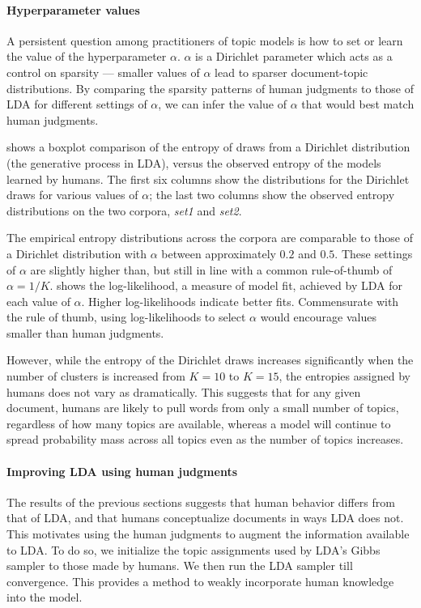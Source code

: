 \paragraph{Hyperparameter values} A persistent question among
practitioners of topic models is how to set or learn the value of the
hyperparameter $\alpha$.  $\alpha$ is a Dirichlet parameter which acts
as a control on sparsity --- smaller values of $\alpha$ lead to sparser
document-topic distributions.  By comparing the sparsity patterns of
human judgments to those of LDA for different settings of $\alpha$, we
can infer the value of $\alpha$ that would best match human judgments.

 shows a boxplot comparison of the entropy of draws
from a Dirichlet distribution (the generative process in LDA), versus
the observed entropy of the models learned by humans.  The first six
columns show the distributions for the Dirichlet draws for various
values of $\alpha$; the last two columns show the observed entropy
distributions on the two corpora, \emph{set1} and \emph{set2}.

The empirical entropy distributions across the corpora are comparable
to those of a Dirichlet distribution with $\alpha$ between
approximately $0.2$ and $0.5$.  These settings of $\alpha$ are
slightly higher than, but still in line with a common rule-of-thumb of
$\alpha = 1 / K$.   shows the log-likelihood, a measure
of model fit, achieved by LDA for each value of $\alpha$.  Higher
log-likelihoods indicate better fits.  Commensurate with the rule of
thumb, using log-likelihoods to select $\alpha$ would encourage values
smaller than human judgments.

However, while the entropy of the Dirichlet draws increases
significantly when the number of clusters is increased from $K=10$ to
$K=15$, the entropies assigned by humans does not vary as
dramatically.  This suggests that for any given document, humans are
likely to pull words from only a small number of topics, regardless of
how many topics are available, whereas a model will continue to spread
probability mass across all topics even as the number of topics
increases.

\paragraph{Improving LDA using human judgments} The results of the
previous sections suggests that human behavior differs from that of
LDA, and that humans conceptualize documents in ways LDA does
not. This motivates using the human judgments to augment the
information available to LDA.  To do so, we initialize the topic
assignments used by LDA's Gibbs sampler to those made by humans.  We
then run the LDA sampler till convergence.  This provides a method to
weakly incorporate human knowledge into the model.

